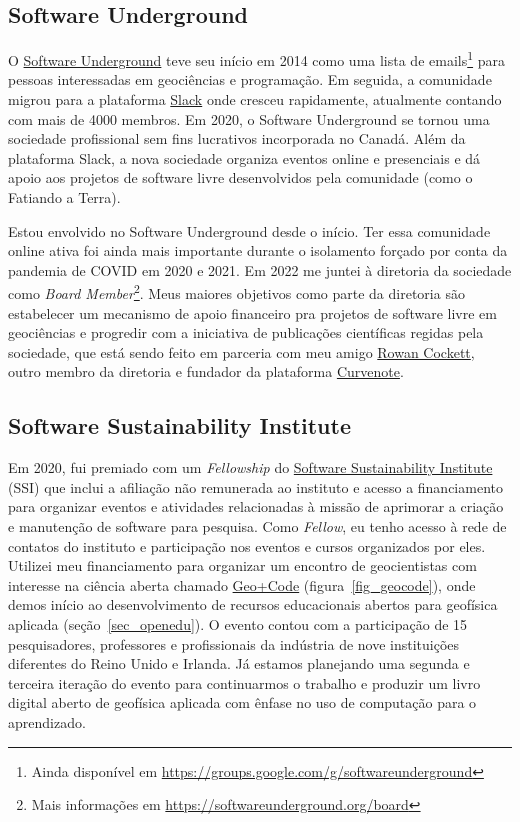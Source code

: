 \documentclass[10pt,a4paper,oneside]{book}
\begin{document}
\subsection{Software Underground}
\label{sec_swung}

O \href{https://softwareunderground.org/}{Software Underground} teve seu início
em 2014 como uma lista de
emails\footnote{Ainda disponível em \url{https://groups.google.com/g/softwareunderground}}
para pessoas interessadas em geociências e programação.
Em seguida, a comunidade migrou para a plataforma
\href{https://softwareunderground.org/slack}{Slack} onde cresceu rapidamente,
atualmente contando com mais de 4000 membros.
Em 2020, o Software Underground se tornou uma sociedade profissional sem fins
lucrativos incorporada no Canadá.
Além da plataforma Slack, a nova sociedade organiza eventos online e
presenciais e dá apoio aos projetos de software livre desenvolvidos pela
comunidade (como o Fatiando a Terra).

Estou envolvido no Software Underground desde o início.
Ter essa comunidade online ativa foi ainda mais importante durante o isolamento
forçado por conta da pandemia de COVID em 2020 e 2021.
Em 2022 me juntei à diretoria da sociedade como
\textit{Board Member}\footnote{Mais informações em \url{https://softwareunderground.org/board}}.
Meus maiores objetivos como parte da diretoria são estabelecer um mecanismo de
apoio financeiro pra projetos de software livre em geociências e progredir com
a iniciativa de publicações científicas regidas pela sociedade, que está sendo
feito em parceria com meu amigo \href{https://row1.ca/}{Rowan Cockett}, outro
membro da diretoria e fundador da plataforma \href{https://curvenote.com/}{Curvenote}.

\subsection{Software Sustainability Institute}
\label{sec_ssi}

Em 2020, fui premiado com um \textit{Fellowship} do
\href{https://software.ac.uk/}{Software Sustainability Institute} (SSI) que
inclui a afiliação não remunerada ao instituto e acesso a financiamento para
organizar eventos e atividades relacionadas à missão de aprimorar a criação e
manutenção de software para pesquisa.
Como \textit{Fellow}, eu tenho acesso à rede de contatos do instituto e
participação nos eventos e cursos organizados por eles.
Utilizei meu financiamento para organizar um encontro de geocientistas com
interesse na ciência aberta chamado
\href{https://hackmd.io/@leouieda/uk-geo-code-meetup}{Geo+Code}
(figura~\ref{fig_geocode}),
onde demos início ao desenvolvimento de recursos educacionais abertos para
geofísica aplicada (seção~\ref{sec_openedu}).
O evento contou com a participação de 15 pesquisadores, professores e
profissionais da indústria de nove instituições diferentes do Reino Unido e
Irlanda.
Já estamos planejando uma segunda e terceira iteração do evento para
continuarmos o trabalho e produzir um livro digital aberto de geofísica
aplicada com ênfase no uso de computação para o aprendizado.
\end{document}
